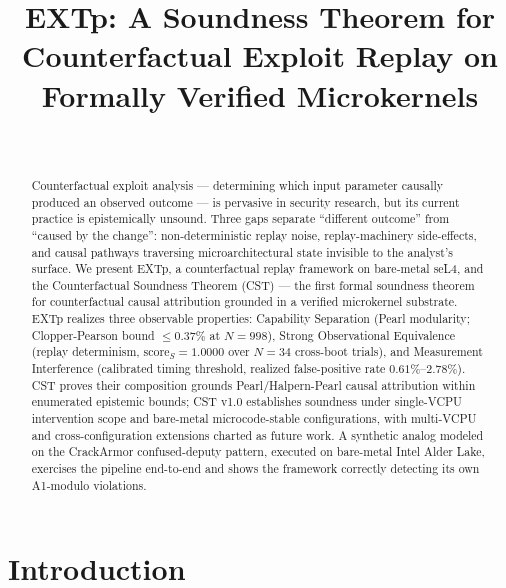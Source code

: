 \documentclass[conference]{IEEEtran}
\newcommand{\scoreS}{\text{score}_S}
\begin{document}
\title{EXTp: A Soundness Theorem for Counterfactual Exploit Replay on Formally Verified Microkernels}

\author{\\
}

\maketitle

\begin{abstract}
Counterfactual exploit analysis --- determining which input
parameter causally produced an observed outcome --- is pervasive
in security research, but its current practice is epistemically
unsound. Three gaps separate ``different outcome'' from ``caused
by the change'': non-deterministic replay noise, replay-machinery
side-effects, and causal pathways traversing microarchitectural
state invisible to the analyst's surface. We present EXTp, a
counterfactual replay framework on bare-metal seL4, and the
Counterfactual Soundness Theorem (CST) --- the first formal
soundness theorem for counterfactual causal attribution grounded
in a verified microkernel substrate. EXTp realizes three
observable properties: Capability
Separation (Pearl modularity; Clopper-Pearson bound
${\leq}0.37\%$ at $N{=}998$), Strong Observational Equivalence
(replay determinism, $\scoreS{=}1.0000$ over $N{=}34$ cross-boot
trials), and Measurement Interference (calibrated timing threshold,
realized false-positive rate $0.61\%$--$2.78\%$). CST proves their
composition grounds Pearl/Halpern-Pearl causal attribution within
enumerated epistemic bounds; CST v1.0 establishes soundness under
single-VCPU intervention scope and bare-metal microcode-stable
configurations, with multi-VCPU and cross-configuration extensions
charted as future work. A synthetic analog modeled on the
CrackArmor confused-deputy pattern, executed on bare-metal Intel
Alder Lake, exercises the pipeline end-to-end and shows the
framework correctly detecting its own A1-modulo violations.
\end{abstract}

\section{Introduction}\label{sec:intro}
\end{document}
